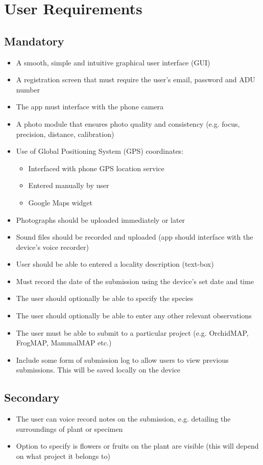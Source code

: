 \documentclass[12pt,a4paper,oneside]{article}
\begin{document}
\section{User Requirements}
\subsection{Mandatory}
    \begin{itemize}
      \item A smooth, simple and intuitive graphical user interface (GUI)
      \item A registration screen that must require the user's email, password and ADU number
      \item The app must interface with the phone camera
      \item A photo module that ensures photo quality and consistency (e.g. focus, precision, distance, calibration)
      \item Use of Global Positioning System (GPS) coordinates:
        \begin{itemize}
          \item Interfaced with phone GPS location service
          \item Entered manually by user
          \item Google Maps widget
        \end{itemize}
      \item Photographs should be uploaded immediately or later
      \item Sound files should be recorded and uploaded (app should interface with the device's voice recorder)
      \item User should be able to entered a locality description (text-box)
      \item Must record the date of the submission using the device's set date and time
      \item The user should optionally be able to specify the species
      \item The user should optionally be able to enter any other relevant observations
      \item The user must be able to submit to a particular project (e.g. OrchidMAP, FrogMAP, MammalMAP etc.)
      \item Include some form of submission log to allow users to view previous submissions. This will be saved locally on the device
    \end{itemize}
\subsection{Secondary}
    \begin{itemize}
      \item The user can voice record notes on the submission, e.g. detailing the surroundings of plant or specimen
      \item Option to specify is flowers or fruits on the plant are visible (this will depend on what project it belongs to)
    \end{itemize}
\end{document}
